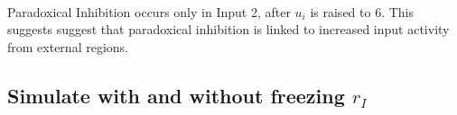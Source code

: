 \documentclass[11pt]{article}
\newcommand{\prompt}[4]{
        {\ttfamily\llap{{\color{#2}[#3]:\hspace{3pt}#4}}\vspace{-\baselineskip}}
    }
\begin{document}
            
\prompt{Out}{outcolor}{16}{}
    
    \begin{center}
    \end{center}
    { \hspace*{\fill} \\}
    

    Paradoxical Inhibition occurs only in Input 2, after \(u_i\) is raised
to 6. This suggests suggest that paradoxical inhibition is linked to
increased input activity from external regions.

    \hypertarget{simulate-with-and-without-freezing-r_i}{%
\subsection{\texorpdfstring{Simulate with and without freezing
\(r_I\)}{Simulate with and without freezing r\_I}}\label{simulate-with-and-without-freezing-r_i}}
\end{document}
